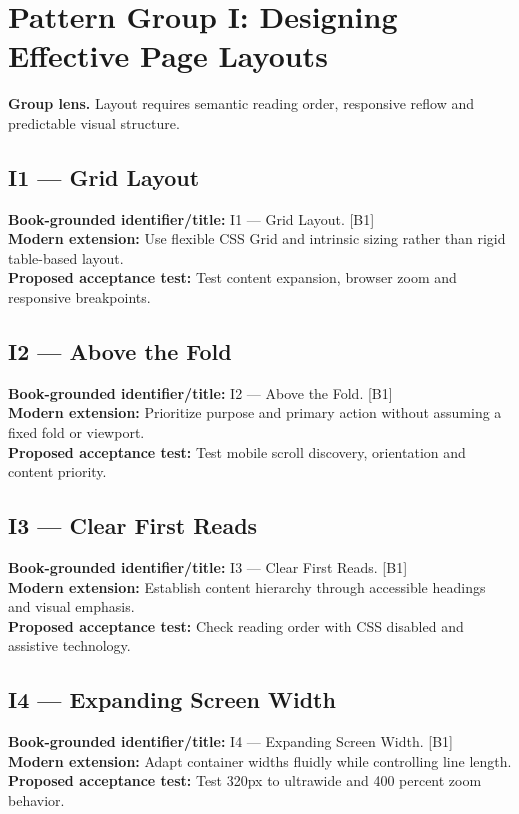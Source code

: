 \documentclass[11pt]{article}
\begin{document}
\section{Pattern Group I: Designing Effective Page Layouts}

\begin{notebox}\textbf{Group lens.} Layout requires semantic reading order, responsive reflow and predictable visual structure.\end{notebox}
\subsection{I1 — Grid Layout}
\noindent\textcolor{Ocean}{\textbf{Book-grounded identifier/title:}} I1 — Grid Layout. [B1]\\
\textcolor{Mint}{\textbf{Modern extension:}} Use flexible CSS Grid and intrinsic sizing rather than rigid table-based layout.\\
\textcolor{Amber}{\textbf{Proposed acceptance test:}} Test content expansion, browser zoom and responsive breakpoints.\medskip
\subsection{I2 — Above the Fold}
\noindent\textcolor{Ocean}{\textbf{Book-grounded identifier/title:}} I2 — Above the Fold. [B1]\\
\textcolor{Mint}{\textbf{Modern extension:}} Prioritize purpose and primary action without assuming a fixed fold or viewport.\\
\textcolor{Amber}{\textbf{Proposed acceptance test:}} Test mobile scroll discovery, orientation and content priority.\medskip
\subsection{I3 — Clear First Reads}
\noindent\textcolor{Ocean}{\textbf{Book-grounded identifier/title:}} I3 — Clear First Reads. [B1]\\
\textcolor{Mint}{\textbf{Modern extension:}} Establish content hierarchy through accessible headings and visual emphasis.\\
\textcolor{Amber}{\textbf{Proposed acceptance test:}} Check reading order with CSS disabled and assistive technology.\medskip
\subsection{I4 — Expanding Screen Width}
\noindent\textcolor{Ocean}{\textbf{Book-grounded identifier/title:}} I4 — Expanding Screen Width. [B1]\\
\textcolor{Mint}{\textbf{Modern extension:}} Adapt container widths fluidly while controlling line length.\\
\textcolor{Amber}{\textbf{Proposed acceptance test:}} Test 320px to ultrawide and 400 percent zoom behavior.\medskip
\end{document}
